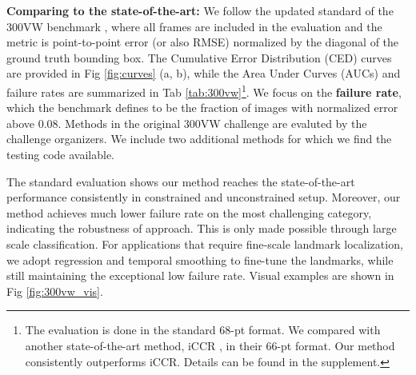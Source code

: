 \documentclass[letterpaper]{article} %
\begin{document}
{\bf Comparing to the state-of-the-art:}
We follow the updated standard of the 300VW benchmark \cite{Chrysos2017ACP}, where all frames are included in the evaluation and the metric is point-to-point error (or also RMSE) normalized by the diagonal of the ground truth bounding box. The Cumulative Error Distribution (CED) curves are provided in Fig \ref{fig:curves} (a, b), while the Area Under Curves (AUCs) and failure rates are summarized in Tab \ref{tab:300vw}\footnote{The evaluation is done in the standard 68-pt format. We compared with another state-of-the-art method, iCCR \cite{SnchezLozano2016CascadedCR}, in their 66-pt format. Our method consistently outperforms iCCR. Details can be found in the supplement.}. We focus on the {\bf failure rate}, which the benchmark defines to be the fraction of images with normalized error above 0.08.
Methods in the original 300VW challenge are evaluted by the challenge organizers. We include two additional methods \cite{Zhu2016FaceAA,Zhang2014FacialLD} for which we find the testing code available.

The standard evaluation shows our method reaches the state-of-the-art performance consistently in constrained and unconstrained setup. Moreover, our method achieves much lower failure rate on the most challenging category, indicating the robustness of approach. This is only made possible through large scale classification. For applications that require fine-scale landmark localization, we adopt regression and temporal smoothing to fine-tune the landmarks, while still maintaining the exceptional low failure rate. Visual examples are shown in Fig \ref{fig:300vw_vis}.
\end{document}
